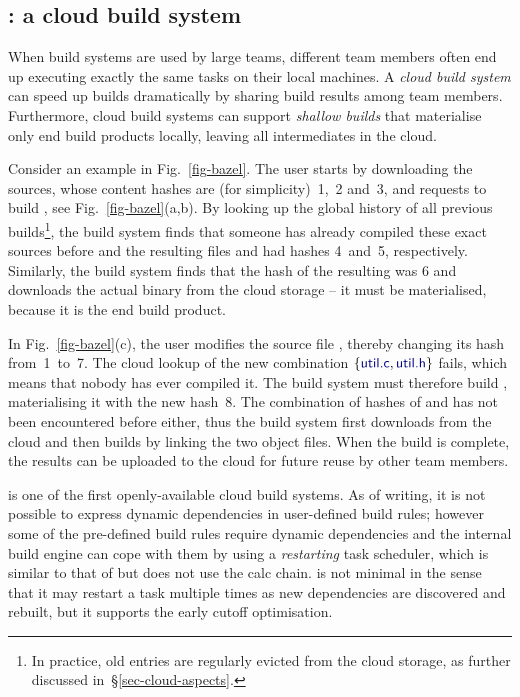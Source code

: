 \vspace{-0.5mm}
\subsection{\Bazel: a cloud build system}\label{sec-background-bazel}
\vspace{-0.5mm}

When build systems are used by large teams, different team members often end up
executing exactly the same tasks on their local machines. A \emph{cloud build
system} can speed up builds dramatically by sharing build results
among team members. Furthermore, cloud build systems can support \emph{shallow
builds} that materialise only end build products locally, leaving all
intermediates in the cloud.

Consider an example in Fig.~\ref{fig-bazel}. The user starts by downloading the
sources, whose content hashes are (for simplicity)~1,~2 and~3, and requests to
build , see Fig.~\ref{fig-bazel}(a,b). By looking up the global
history of all previous builds\footnote{In practice, old entries are regularly
evicted from the cloud storage, as further discussed
in~\S\ref{sec-cloud-aspects}.}, the build system finds that someone has already
compiled these exact sources before and the resulting files  and
 had hashes 4~and~5, respectively. Similarly, the build system finds
that the hash of the resulting  was 6 and downloads the actual
binary from the cloud storage -- it must be materialised, because it is the end
build product.

In Fig.~\ref{fig-bazel}(c), the user modifies the source file ,
thereby changing its hash from~1~to~7. The cloud lookup of the new combination
$\{\cmd{util.c}, \cmd{util.h}\}$ fails, which means that nobody has ever
compiled it. The build system must therefore build , materialising
it with the new hash~8. The combination of hashes of  and
 has not been encountered before either, thus the build system first
downloads  from the cloud and then builds  by linking
the two object files. When the build is complete, the results can be uploaded to
the cloud for future reuse by other team members.

\Bazel is one of the first openly-available cloud build systems.
As of writing, it is not possible to express dynamic dependencies in
user-defined build rules; however some of the pre-defined build rules require
dynamic dependencies and the internal build engine can cope with them by using
a \emph{restarting} task scheduler, which is similar to that of \Excel but does
not use the calc chain. \Bazel is not minimal in the sense that it may restart a
task multiple times as new dependencies are discovered and rebuilt, but it
supports the early cutoff optimisation.

